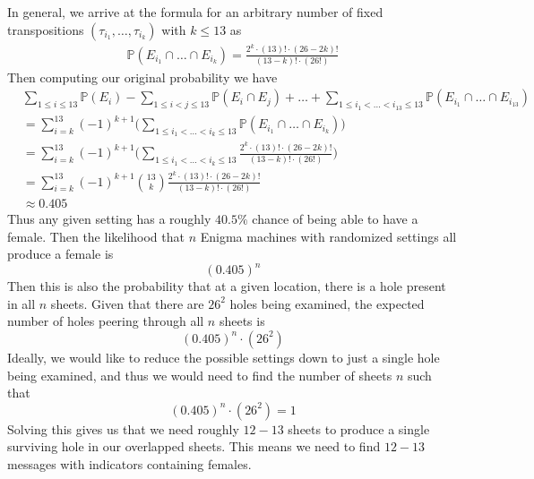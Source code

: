 \noindent In general, we arrive at the formula for an arbitrary
number of fixed transpositions $(\tau_{i_1}, \dots, \tau_{i_k})$ with
$k \le 13$ as
\begin{align*}
	\mathbb{P}(E_{i_1}\cap\dots\cap E_{i_k}) = \frac{2^k\cdot
		(13)!\cdot(26-2k)!}{(13-k)!\cdot(26!)}
\end{align*}
Then computing our original probability we have
\begin{align*}
	 & \sum_{1 \le i \le 13}\mathbb{P}(E_i) - \sum_{1\le i < j \le
		13}\mathbb{P}(E_i\cap E_j) + \dots + \sum_{1\le i_1 < \dots <i_{13}
	\le 13}\mathbb{P}(E_{i_1}\cap\dots\cap E_{i_{13}})                \\
	 & = \sum_{i=k}^{13}(-1)^{k+1}\biggl(\sum_{1\le i_1 < \dots < i_k
			\le 13}\mathbb{P}(E_{i_1}\cap\dots\cap E_{i_k})\biggr)
	\\
	 & = \sum_{i=k}^{13}(-1)^{k+1}\biggl(\sum_{1\le i_1 < \dots < i_k
			\le 13}\frac{2^k\cdot (13)!\cdot(26-2k)!}{(13-k)!\cdot(26!)}\biggr)
	\\
	 & = \sum_{i=k}^{13}(-1)^{k+1}{13\choose k}\frac{2^k\cdot
		(13)!\cdot(26-2k)!}{(13-k)!\cdot(26!)}
	\\
	 & \approx 0.405
\end{align*}
\noindent Thus any given setting has a roughly $40.5\%$ chance of
being able to have a female. Then the likelihood that $n$ Enigma
machines with randomized settings all produce a female is
\[
	(0.405)^n
\]
Then this is also the probability that at a given location, there is
a hole present in all $n$ sheets. Given that there are $26^2$ holes
being examined, the expected number of holes peering through all $n$ sheets is
\[
	(0.405)^n\cdot(26^2)
\]
Ideally, we would like to reduce the possible settings down to just a
single hole being examined, and thus we would need to find the number
of sheets $n$ such that
\[
	(0.405)^n\cdot(26^2) = 1
\]
Solving this gives us that we need roughly $12-13$ sheets to produce
a single surviving hole in our overlapped sheets. This means we need
to find $12-13$ messages with indicators containing females.

